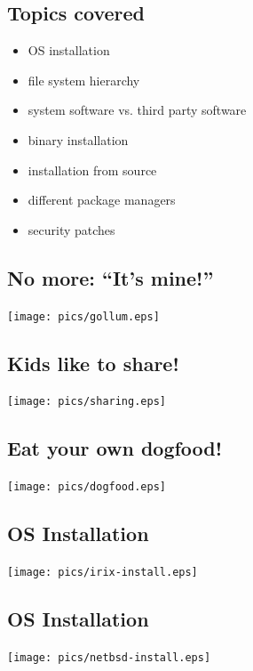 \documentclass[xga]{xdvislides}
\begin{document}
\subsection{Topics covered}
\begin{itemize}
	\item OS installation
	\item file system hierarchy
	\item system software vs. third party software
	\item binary installation
	\item installation from source
	\item different package managers
	\item security patches
\end{itemize}

\subsection{No more: ``It's mine!''}
\begin{center}
	\texttt{[image: pics/gollum.eps]}
\end{center}

\subsection{Kids like to share!}
\begin{center}
	\texttt{[image: pics/sharing.eps]}
\end{center}

\subsection{Eat your own dogfood!}
\begin{center}
	\texttt{[image: pics/dogfood.eps]}
\end{center}



\subsection{OS Installation}
\begin{center}
	\texttt{[image: pics/irix-install.eps]}
\end{center}

\subsection{OS Installation}
\begin{center}
	\texttt{[image: pics/netbsd-install.eps]}
\end{center}
\end{document}
